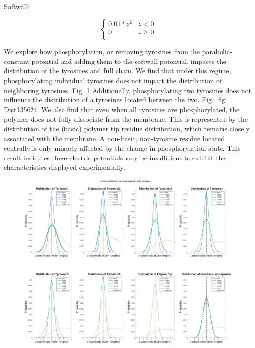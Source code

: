 \documentclass[../../AdvancementSummary.tex]{subfiles}
\begin{document}
{Softwall:

\begin{equation}\label{eq: softwall}
\begin{cases}
0.01*z^2 	& z < 0\\
0 & z \geq 0 \\
\end{cases}
\end{equation}

We explore how phosphorylation, or removing tyrosines from the parabolic-constant potential and adding them to the softwall potential, impacts the distribution of the tyrosines and full chain. We find that under this regime, phosphorylating individual tyrosines does not impact the distribution of neighboring tyrosines. Fig. \ref{fig: Dist123456} Additionally, phosphorylating two tyrosines does not influence the distribution of a tyrosines located between the two. Fig. \ref{fig: Dist135624} We also find that even when all tyrosines are phosphorylated, the polymer does not fully dissociate from the membrane. This is represented by the distribution of the (basic) polymer tip residue distribution, which remains closely associated with the membrane. A non-basic, non-tyrosine residue located centrally is only minorly affected by the change in phosphorylation state. This result indicates these electric potentials may be insufficient to exhibit the characteristics displayed experimentally.

\begin{figure}[H]
\begin{center}
\includegraphics[width=\linewidth]{ResultsFigures/CD3ZetaSoftwallPiecewiseBasicsY/Phosphorylation/iSiteDistribution123456.eps}
\end{center}
\caption{\label{fig: Dist123456}}
\end{figure}

}
\end{document}
